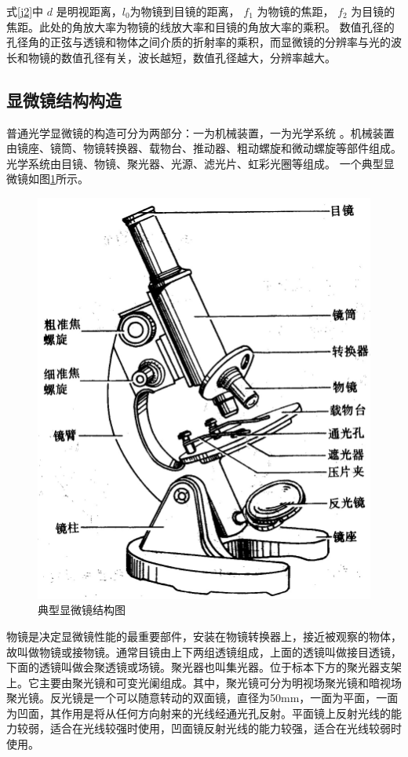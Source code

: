 式\ref{j2}中 $d$ 是明视距离，$l_{0}$为物镜到目镜的距离， $f_{1}$ 为物镜的焦距， $f_{2}$ 为目镜的焦距。此处的角放大率为物镜的线放大率和目镜的角放大率的乘积。
数值孔径的孔径角的正弦与透镜和物体之间介质的折射率的乘积，而显微镜的分辨率与光的波长和物镜的数值孔径有关，波长越短，数值孔径越大，分辨率越大\cite{fenbianlv}。


\subsection{显微镜结构构造}
普通光学显微镜的构造可分为两部分：一为机械装置，一为光学系统 。机械装置由镜座、镜筒、物镜转换器、载物台、推动器、粗动螺旋和微动螺旋等部件组成。光学系统由目镜、物镜、聚光器、光源、滤光片、虹彩光圈等组成。
一个典型显微镜如图\ref{fig:mi_1}所示。
\begin{figure}[h]
\centering
\includegraphics[width=0.7\linewidth]{Figure/mi_1}
\caption{典型显微镜结构图}
\label{fig:mi_1}
\end{figure}


物镜是决定显微镜性能的最重要部件，安装在物镜转换器上，接近被观察的物体，故叫做物镜或接物镜。通常目镜由上下两组透镜组成，上面的透镜叫做接目透镜，下面的透镜叫做会聚透镜或场镜。聚光器也叫集光器。位于标本下方的聚光器支架上。它主要由聚光镜和可变光阑组成。其中，聚光镜可分为明视场聚光镜和暗视场聚光镜。反光镜是一个可以随意转动的双面镜，直径为50mm，一面为平面，一面为凹面，其作用是将从任何方向射来的光线经通光孔反射。平面镜上反射光线的能力较弱，适合在光线较强时使用，凹面镜反射光线的能力较强，适合在光线较弱时使用。

